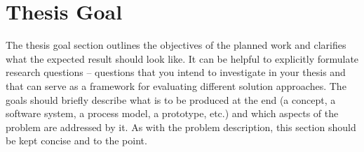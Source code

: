 \section*{Thesis Goal}
\label{sec:goal}

The thesis goal section outlines the objectives of the planned work and clarifies what the expected result should look like.
It can be helpful to explicitly formulate research questions -- questions that you intend to investigate in your thesis and that can serve as a framework for evaluating different solution approaches.
The goals should briefly describe what is to be produced at the end (a concept, a software system, a process model, a prototype, etc.) and which aspects of the problem are addressed by it.
As with the problem description, this section should be kept concise and to the point.

\blindtext

